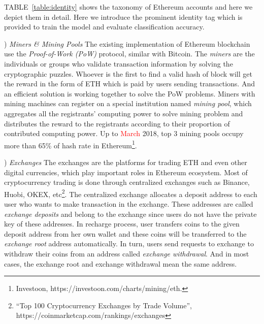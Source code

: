 TABLE~\ref{table:identity} shows the taxonomy of Ethereum accounts and here we depict them in detail. Here we introduce the prominent identity tag which is provided to train the model and evaluate classification accuracy.

) \emph{Miners \& Mining Pools}
The existing implementation of Ethereum blockchain use the \emph{Proof-of-Work (PoW)} protocol, similar with Bitcoin.
The \emph{miners} are the individuals or groups who validate transaction information by solving the cryptographic puzzles. Whoever is the first to find a valid hash of block will get the reward in the form of ETH which is paid by users sending transactions. And an efficient solution is working together to solve the PoW problems. Miners with mining machines can register on a special institution named \emph{mining pool}, which aggregates all the registrants' computing power to solve mining problem and distributes the reward to the registrants according to their proportion of contributed computing power. Up to \textcolor{red}{March} 2018, top $3$ mining pools occupy more than 65\% of hash rate in Ethereum\footnote{Investoon, https://investoon.com/charts/mining/eth.}.



) \emph{Exchanges}
The exchanges are the platforms for trading ETH and even other digital currencies, which play important roles in Ethereum ecosystem. Most of cryptocurrency trading is done through centralized exchanges such as Binance, Huobi, OKEX, etc\footnote{``Top 100 Cryptocurrency Exchanges by Trade Volume'', https://coinmarketcap.com/rankings/exchanges}. The centralized exchange allocates a deposit address to each user who wants to make transaction in the exchange. These addresses are called \emph{exchange deposits} and belong to the exchange since users do not have the private key of these addresses. In recharge process, user transfers coins to the given deposit address from her own wallet and these coins will be transferred to the \emph{exchange root} address automatically. In turn, users send requests to exchange to withdraw their coins from an address called \emph{exchange withdrawal}. And in most cases, the exchange root and exchange withdrawal mean the same address.


